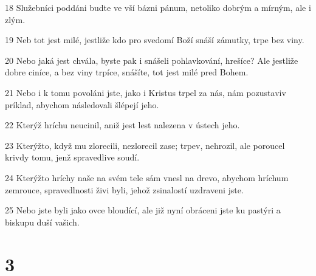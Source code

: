 \par 18 Služebníci poddáni budte ve vší bázni pánum, netoliko dobrým a mírným, ale i zlým.
\par 19 Neb tot jest milé, jestliže kdo pro svedomí Boží snáší zámutky, trpe bez viny.
\par 20 Nebo jaká jest chvála, byste pak i snášeli pohlavkování, hrešíce? Ale jestliže dobre ciníce, a bez viny trpíce, snášíte, tot jest milé pred Bohem.
\par 21 Nebo i k tomu povoláni jste, jako i Kristus trpel za nás, nám pozustaviv príklad, abychom následovali šlépejí jeho.
\par 22 Kterýž hríchu neucinil, aniž jest lest nalezena v ústech jeho.
\par 23 Kterýžto, když mu zlorecili, nezlorecil zase; trpev, nehrozil, ale poroucel krivdy tomu, jenž spravedlive soudí.
\par 24 Kterýžto hríchy naše na svém tele sám vnesl na drevo, abychom hríchum zemrouce, spravedlnosti živi byli, jehož zsinalostí uzdraveni jste.
\par 25 Nebo jste byli jako ovce bloudící, ale již nyní obráceni jste ku pastýri a biskupu duší vašich.

\chapter{3}

